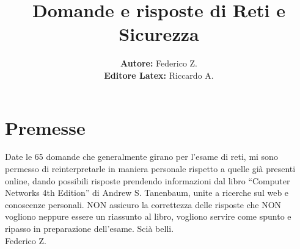 

\author{\textbf{Autore:} Federico Z. \\ \textbf{Editore Latex:} Riccardo A.}
\title{\textbf{Domande e risposte di Reti e Sicurezza}}



\maketitle
\vspace{5cm}
\section*{Premesse}
Date le 65 domande che generalmente girano per l’esame di reti, mi sono permesso di reinterpretarle in maniera personale rispetto a quelle già presenti online, dando possibili risposte prendendo informazioni dal libro “Computer Networks 4th Edition” di Andrew S. Tanenbaum, unite a ricerche sul web e conoscenze personali. NON assicuro la correttezza delle risposte che NON vogliono neppure essere un riassunto al libro, vogliono servire come spunto e ripasso in preparazione dell’esame. Scià belli. \\
Federico Z.

\newpage
\tableofcontents
\newpage



